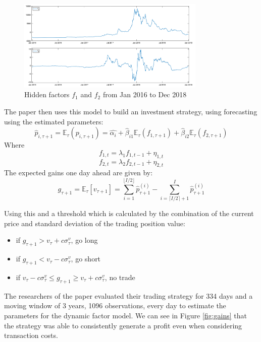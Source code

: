 \begin{figure}[h!]
    \centering
    \includegraphics[width=0.8\textwidth]{background/Images/hidden_factors.png}
    \caption{Hidden factors $f_1$ and $f_2$ from Jan 2016 to Dec 2018~\cite{Figa-TalamancaGianna2021Cdff}}
    \label{fig:hiddenfactors}
\end{figure}
\vspace{5mm}
\noindent The paper then uses this model to build an investment strategy, using forecasting using the estimated parameters:
$$\hat{p}_{i, \tau + 1} = \mathbb{E}_{\tau}(p_{i, \tau + 1}) = \hat{\alpha_i} + \hat{\beta}_{i 1} \mathbb{E}_{\tau}(f_{1, \tau + 1}) + \hat{\beta}_{i 2} \mathbb{E}_{\tau}(f_{2, \tau + 1}) $$
Where
$$f_{1, t} = \lambda_1 f_{1, t-1} + \eta_{1,t}$$
$$f_{2, t} = \lambda_2 f_{2, t-1} + \eta_{2,t}$$
The expected gains one day ahead are given by:
$$g_{\tau + 1} =  \mathbb{E}_{\tau}[v_{\tau + 1}] = \sum_{i=1}^{\lfloor I / 2 \rfloor} \hat{p}_{\tau + 1}^{(i)} - \sum_{i=\lceil I / 2 \rceil + 1}^{I} \hat{p}_{\tau + 1}^{(i)} $$

\noindent Using this and a threshold which is calculated by the combination of the current price and standard deviation of the trading position value:
\begin{itemize}
    \itemsep0em
    \item if $g_{\tau + 1} > v_{\tau} + c \sigma_{\tau}^v$, go long
    \item if $g_{\tau + 1} < v_{\tau} - c \sigma_{\tau}^v$, go short
    \item if $v_{\tau} - c \sigma_{\tau}^v \leq g_{\tau + 1} \geq v_{\tau} + c \sigma_{\tau}^v$, no trade
\end{itemize}

\noindent The researchers of the paper evaluated their trading strategy for 334 days and a moving window of 3 years, 1096 observations, every day to estimate the parameters for the dynamic factor model. We can see in Figure \ref{fig:gains} that the strategy was able to consistently generate a profit even when considering transaction costs.

